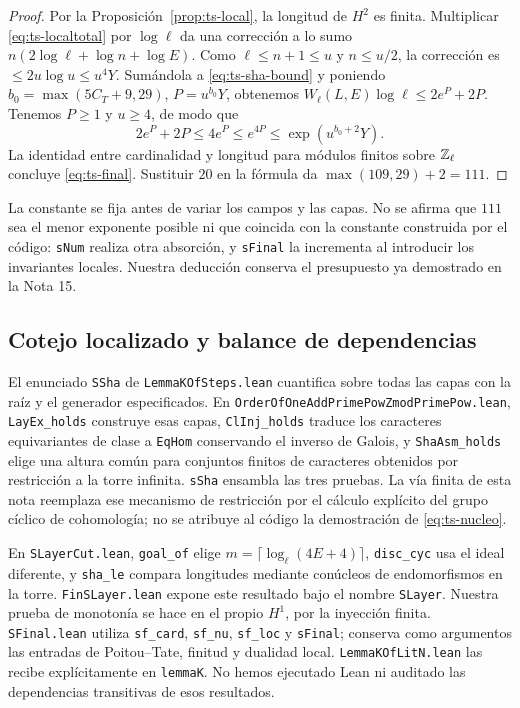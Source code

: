 \begin{proof}
Por la Proposición~\ref{prop:ts-local}, la longitud de $H^2$ es finita. Multiplicar \eqref{eq:ts-localtotal} por $\log\ell$ da una corrección a lo sumo $n(2\log\ell+\log n+\log E)$. Como $\ell\le n+1\le u$ y $n\le u/2$, la corrección es $\le2u\log u\le u^4Y$. Sumándola a \eqref{eq:ts-sha-bound} y poniendo $b_0=\max(5C_T+9,29)$, $P=u^{b_0}Y$, obtenemos $W_\ell(L,E)\log\ell\le2e^P+2P$. Tenemos $P\ge1$ y $u\ge4$, de modo que
\[
 2e^P+2P\le4e^P\le e^{4P}\le\exp(u^{b_0+2}Y).
\]
La identidad entre cardinalidad y longitud para módulos finitos sobre $\mathbb{Z}_\ell$ concluye \eqref{eq:ts-final}. Sustituir $20$ en la fórmula da $\max(109,29)+2=111$.
\end{proof}

La constante se fija antes de variar los campos y las capas. No se afirma que $111$ sea el menor exponente posible ni que coincida con la constante construida por el código: \texttt{sNum} realiza otra absorción, y \texttt{sFinal} la incrementa al introducir los invariantes locales. Nuestra deducción conserva el presupuesto ya demostrado en la Nota 15.

\subsection{Cotejo localizado y balance de dependencias}

El enunciado \texttt{SSha} de \texttt{LemmaKOfSteps.lean} cuantifica sobre todas las capas con la raíz y el generador especificados. En \texttt{OrderOfOneAddPrimePowZmodPrimePow.lean}, \texttt{LayEx\_holds} construye esas capas, \texttt{ClInj\_holds} traduce los caracteres equivariantes de clase a \texttt{EqHom} conservando el inverso de Galois, y \texttt{ShaAsm\_holds} elige una altura común para conjuntos finitos de caracteres obtenidos por restricción a la torre infinita. \texttt{sSha} ensambla las tres pruebas. La vía finita de esta nota reemplaza ese mecanismo de restricción por el cálculo explícito del grupo cíclico de cohomología; no se atribuye al código la demostración de \eqref{eq:ts-nucleo}.

En \texttt{SLayerCut.lean}, \texttt{goal\_of} elige $m=\lceil\log_\ell(4E+4)\rceil$, \texttt{disc\_cyc} usa el ideal diferente, y \texttt{sha\_le} compara longitudes mediante conúcleos de endomorfismos en la torre. \texttt{FinSLayer.lean} expone este resultado bajo el nombre \texttt{SLayer}. Nuestra prueba de monotonía se hace en el propio $H^1$, por la inyección finita. \texttt{SFinal.lean} utiliza \texttt{sf\_card}, \texttt{sf\_nu}, \texttt{sf\_loc} y \texttt{sFinal}; conserva como argumentos las entradas de Poitou--Tate, finitud y dualidad local. \texttt{LemmaKOfLitN.lean} las recibe explícitamente en \texttt{lemmaK}. No hemos ejecutado Lean ni auditado las dependencias transitivas de esos resultados.

